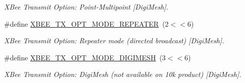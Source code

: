 \begin{DoxyCompactItemize}
\begin{DoxyCompactList}\small\item\em X\-Bee Transmit Option\-: Point-\/\-Multipoint \mbox{[}Digi\-Mesh\mbox{]}. \end{DoxyCompactList}\item 
\hypertarget{group__xbee__wpan_ga53517f5071a4aa5943b52a9c3574a77b}{\#define \hyperlink{group__xbee__wpan_ga53517f5071a4aa5943b52a9c3574a77b}{X\-B\-E\-E\-\_\-\-T\-X\-\_\-\-O\-P\-T\-\_\-\-M\-O\-D\-E\-\_\-\-R\-E\-P\-E\-A\-T\-E\-R}~(2$<$$<$6)}\label{group__xbee__wpan_ga53517f5071a4aa5943b52a9c3574a77b}

\begin{DoxyCompactList}\small\item\em X\-Bee Transmit Option\-: Repeater mode (directed broadcast) \mbox{[}Digi\-Mesh\mbox{]}. \end{DoxyCompactList}\item 
\hypertarget{group__xbee__wpan_ga14d141b74c47cb6b0dfbd3563d4b097c}{\#define \hyperlink{group__xbee__wpan_ga14d141b74c47cb6b0dfbd3563d4b097c}{X\-B\-E\-E\-\_\-\-T\-X\-\_\-\-O\-P\-T\-\_\-\-M\-O\-D\-E\-\_\-\-D\-I\-G\-I\-M\-E\-S\-H}~(3$<$$<$6)}\label{group__xbee__wpan_ga14d141b74c47cb6b0dfbd3563d4b097c}

\begin{DoxyCompactList}\small\item\em X\-Bee Transmit Option\-: Digi\-Mesh (not available on 10k product) \mbox{[}Digi\-Mesh\mbox{]}. \end{DoxyCompactList}\end{DoxyCompactItemize}
